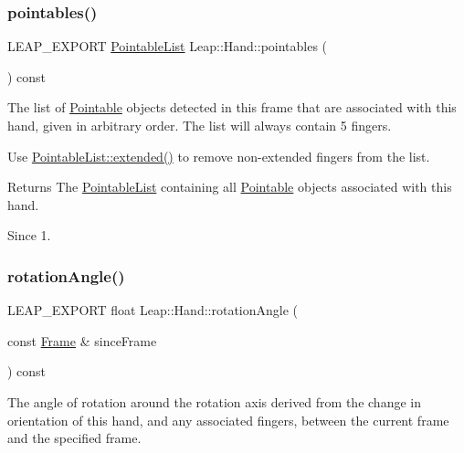 \subsubsection{\texorpdfstring{pointables()}{pointables()}}
{\footnotesize\ttfamily L\+E\+A\+P\+\_\+\+E\+X\+P\+O\+RT \hyperlink{class_leap_1_1_pointable_list}{Pointable\+List} Leap\+::\+Hand\+::pointables (\begin{DoxyParamCaption}{ }\end{DoxyParamCaption}) const}

The list of \hyperlink{class_leap_1_1_pointable}{Pointable} objects detected in this frame that are associated with this hand, given in arbitrary order. The list will always contain 5 fingers.

Use \hyperlink{class_leap_1_1_pointable_list_a47919c7b8198806da5af4c7d351d83fc}{Pointable\+List\+::extended()} to remove non-\/extended fingers from the list.


\begin{DoxyCodeInclude}
\end{DoxyCodeInclude}


\begin{DoxyReturn}{Returns}
The \hyperlink{class_leap_1_1_pointable_list}{Pointable\+List} containing all \hyperlink{class_leap_1_1_pointable}{Pointable} objects associated with this hand. 
\end{DoxyReturn}
\begin{DoxySince}{Since}
1. 
\end{DoxySince}
\mbox{\label{class_leap_1_1_hand_ad7dd8985dde02d07daf7c81a050e6e24}} 
\subsubsection{\texorpdfstring{rotation\+Angle()}{rotationAngle()}\hspace{0.1cm}{\footnotesize\ttfamily [1/2]}}
{\footnotesize\ttfamily L\+E\+A\+P\+\_\+\+E\+X\+P\+O\+RT float Leap\+::\+Hand\+::rotation\+Angle (\begin{DoxyParamCaption}\item[{const \hyperlink{class_leap_1_1_frame}{Frame} \&}]{since\+Frame }\end{DoxyParamCaption}) const}

The angle of rotation around the rotation axis derived from the change in orientation of this hand, and any associated fingers, between the current frame and the specified frame.


